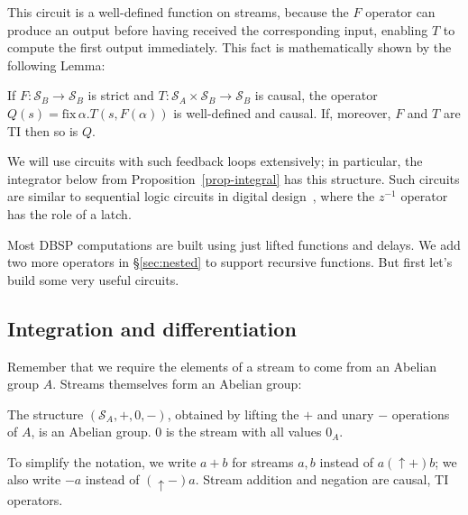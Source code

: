\documentclass[twocolumn
]{svjour3}
\numberwithin{equation}{section}
\newcommand{\dbsp}{DBSP\xspace}
\newcommand{\stream}[1]{\ensuremath{\mathcal{S}_{#1}}}
\newcommand{\zm}{\ensuremath{z^{-1}}} %
\newcommand{\secref}[1]{\S\ref{#1}}  %
\newcommand{\fix}[2]{\mbox{fix}\,#1.#2}
\newcommand{\lift}[1]{{\uparrow}#1}
\begin{document}
This circuit is a well-defined function on streams, because the $F$
operator can produce an output before having received the
corresponding input, enabling $T$ to compute the first output
immediately.  This fact is mathematically shown by the following
Lemma:


\begin{lemma}\label{feedback-semantics}
\label{cor-loop}
If $F: \stream{B} \to \stream{B}$ is strict and $T: \stream{A} \times \stream{B} \to \stream{B}$ is causal,
the operator $Q(s)=\fix{\alpha}{T(s,F(\alpha))}$ is well-defined and causal.
If, moreover, $F$ and $T$ are TI then so is $Q$.
\end{lemma}

We will use circuits with such feedback loops extensively; in
particular, the integrator below from Proposition~\ref{prop-integral}
has this structure.  Such circuits are similar to sequential logic
circuits in digital design~\cite{sequential-logic}, where the $\zm$
operator has the role of a latch.

Most \dbsp computations are built using just lifted functions and
delays.  We add two more operators in \secref{sec:nested} to support
recursive functions.  But first let's build some very useful circuits.

\subsection{Integration and differentiation}\label{sec:abelianstreams}

Remember that we require the elements of a stream to come from an
Abelian group $A$.  Streams themselves form an Abelian group:

\begin{proposition}
The structure $(\stream{A},+,0,-)$, obtained by lifting the $+$ and
unary $-$ operations of $A$, is an Abelian group.  $0$ is the stream
with all values $0_A$.
\end{proposition}

\noindent
To simplify the notation, we write $a + b$ for streams $a, b$ instead
of $a (\lift{+}) b$; we also write $-a$ instead of $(\lift{-})a$.
Stream addition and negation are causal, TI operators.
\end{document}
